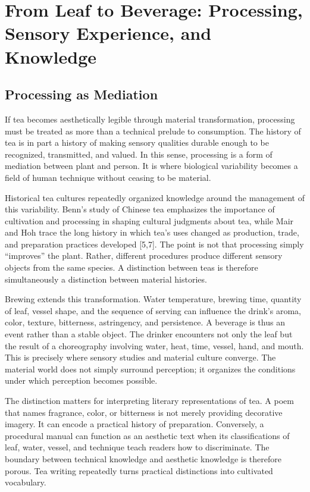 \documentclass[11pt,a4paper]{article}
\begin{document}
\section{From Leaf to Beverage: Processing, Sensory Experience, and Knowledge}

\subsection{Processing as Mediation}

If tea becomes aesthetically legible through material transformation, processing must be treated as more than a technical prelude to consumption. The history of tea is in part a history of making sensory qualities durable enough to be recognized, transmitted, and valued. In this sense, processing is a form of mediation between plant and person. It is where biological variability becomes a field of human technique without ceasing to be material.

Historical tea cultures repeatedly organized knowledge around the management of this variability. Benn's study of Chinese tea emphasizes the importance of cultivation and processing in shaping cultural judgments about tea, while Mair and Hoh trace the long history in which tea's uses changed as production, trade, and preparation practices developed [5,7]. The point is not that processing simply ``improves'' the plant. Rather, different procedures produce different sensory objects from the same species. A distinction between teas is therefore simultaneously a distinction between material histories.

Brewing extends this transformation. Water temperature, brewing time, quantity of leaf, vessel shape, and the sequence of serving can influence the drink's aroma, color, texture, bitterness, astringency, and persistence. A beverage is thus an event rather than a stable object. The drinker encounters not only the leaf but the result of a choreography involving water, heat, time, vessel, hand, and mouth. This is precisely where sensory studies and material culture converge. The material world does not simply surround perception; it organizes the conditions under which perception becomes possible.

The distinction matters for interpreting literary representations of tea. A poem that names fragrance, color, or bitterness is not merely providing decorative imagery. It can encode a practical history of preparation. Conversely, a procedural manual can function as an aesthetic text when its classifications of leaf, water, vessel, and technique teach readers how to discriminate. The boundary between technical knowledge and aesthetic knowledge is therefore porous. Tea writing repeatedly turns practical distinctions into cultivated vocabulary.
\end{document}
